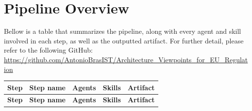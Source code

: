 \chapter{Pipeline Overview}
\label{chapter:appendixA}

Bellow is a table that summarizes the pipeline, along with every agent and skill involved in each step, as well as the outputted artifact. For further detail, please refer to the following GitHub: \url{https://github.com/AntonioBrasIST/Architecture_Viewpoints_for_EU_Regulation}

\begin{landscape}
\scriptsize
\setlength{\tabcolsep}{2pt}
\renewcommand{\arraystretch}{0.92}

\begin{longtable}{@{}p{0.5cm}p{2.5cm}p{4.3cm}p{8.0cm}p{4.0cm}@{}}
\hline
\textbf{Step} & \textbf{Step name} & \textbf{Agents} & \textbf{Skills} & \textbf{Artifact} \\
\hline
\endfirsthead

\hline
\textbf{Step} & \textbf{Step name} & \textbf{Agents} & \textbf{Skills} & \textbf{Artifact} \\
\hline
\endhead


\end{longtable}
\end{landscape}
